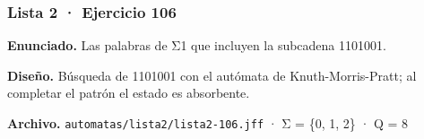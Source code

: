 
\hypertarget{lista-2-ejercicio-106}{%
\subsubsection{Lista 2 · Ejercicio 106}\label{lista-2-ejercicio-106}}

\textbf{Enunciado.} Las palabras de Σ1 que incluyen la subcadena 1101001.

\textbf{Diseño.} Búsqueda de 1101001 con el autómata de Knuth-Morris-Pratt; al completar el patrón el estado es absorbente.

\textbf{Archivo.} \texttt{automatas/lista2/lista2-106.jff} · Σ = \{0, 1, 2\} · \textbar Q\textbar{} = 8

